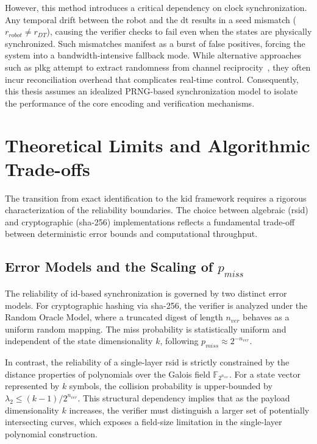 However, this method introduces a critical dependency on clock synchronization. Any temporal drift between the robot and the \gls{dt} results in a seed mismatch ($r_{robot} \neq r_{DT}$), causing the verifier checks to fail even when the states are physically synchronized. Such mismatches manifest as a burst of false positives, forcing the system into a bandwidth-intensive fallback mode. While alternative approaches such as \gls{plkg} attempt to extract randomness from channel reciprocity~\cite{li2019physical}, they often incur reconciliation overhead that complicates real-time control. Consequently, this thesis assumes an idealized PRNG-based synchronization model to isolate the performance of the core encoding and verification mechanisms.

\section{Theoretical Limits and Algorithmic Trade-offs}
\label{sec:theoretical_limits}

The transition from exact identification to the \gls{kid} framework requires a rigorous characterization of the reliability boundaries. The choice between algebraic (\gls{rsid}) and cryptographic (\gls{sha}-256) implementations reflects a fundamental trade-off between deterministic error bounds and computational throughput.

\subsection{Error Models and the Scaling of \texorpdfstring{$p_{miss}$}{p\_miss}}
\label{subsec:error_models}

The reliability of \gls{id}-based synchronization is governed by two distinct error models. For cryptographic hashing via \gls{sha}-256, the verifier is analyzed under the Random Oracle Model, where a truncated digest of length $n_{ver}$ behaves as a uniform random mapping. The miss probability is statistically uniform and independent of the state dimensionality $k$, following $p_{miss} \approx 2^{-n_{ver}}$.

In contrast, the reliability of a single-layer \gls{rsid} is strictly constrained by the distance properties of polynomials over the Galois field $\mathbb{F}_{2^{n_{ver}}}$. For a state vector represented by $k$ symbols, the collision probability is upper-bounded by $\lambda_2 \le (k-1)/2^{n_{ver}}$. This structural dependency implies that as the payload dimensionality $k$ increases, the verifier must distinguish a larger set of potentially intersecting curves, which exposes a field-size limitation in the single-layer polynomial construction.


